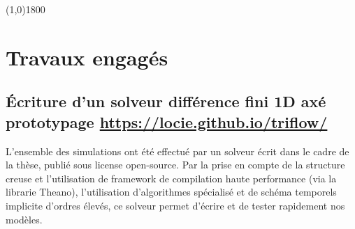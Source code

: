 \documentclass[a0,portrait]{a0poster}
\begin{document}
\begin{center}
    \line(1,0){1800}
\end{center}

\section*{Travaux engagés}
\subsection*{Écriture d'un solveur différence fini 1D axé prototypage \url{https://locie.github.io/triflow/}}
    L'ensemble des simulations ont été effectué par un solveur écrit dans le cadre de la thèse, publié sous license open-source. Par la prise en compte de la structure creuse et l'utilisation de framework de compilation haute performance (via la librarie Theano), l'utilisation d'algorithmes spécialisé et de schéma temporels implicite d'ordres élevés, ce solveur permet d'écrire et de tester rapidement nos modèles.
\end{document}
